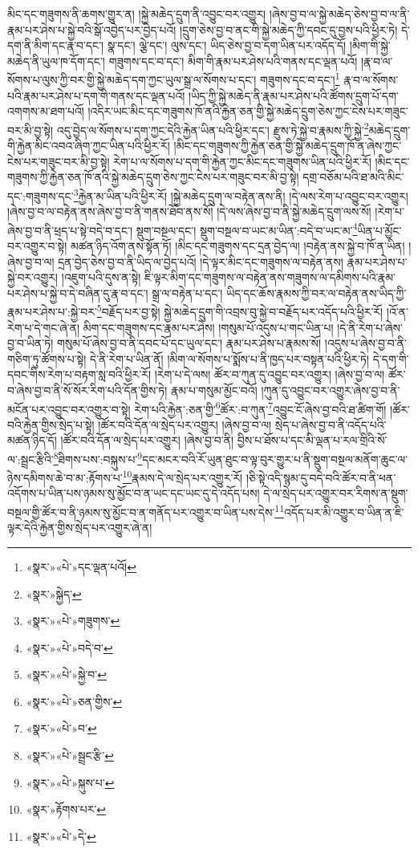 མིང་དང་གཟུགས་ནི་ཆགས་གྱུར་ན། །སྐྱེ་མཆེད་དྲུག་ནི་འབྱུང་བར་འགྱུར། །ཞེས་བྱ་བ་ལ་སྐྱེ་མཆེད་ཅེས་བྱ་བ་ལ་ནི་རྣམ་པར་ཤེས་པ་སྐྱེ་བའི་སྒོ་འབྱེད་པར་བྱེད་པའོ། །དྲུག་ཅེས་བྱ་བ་ནང་གི་སྐྱེ་མཆེད་ཀྱི་དབང་དུ་བྱས་པའི་ཕྱིར་ཏེ། དེ་དག་ནི་མིག་དང་རྣ་བ་དང་། སྣ་དང་། ལྕེ་དང་། ལུས་དང་། ཡིད་ཅེས་བྱ་བ་དག་ཡིན་པར་འདོད་དོ། །མིག་གི་སྐྱེ་མཆེད་ནི་ཡུལ་ཁ་དོག་དང་། གཟུགས་དང་བ་དང་། མིག་གི་རྣམ་པར་ཤེས་པའི་གནས་དང་ལྡན་པའོ། །རྣ་བ་ལ་སོགས་པ་ལུས་ཀྱི་བར་གྱི་སྐྱེ་མཆེད་དག་ཀྱང་ཡུལ་སྒྲ་ལ་སོགས་པ་དང་། གཟུགས་དང་བ་དང་།\footnote{«སྣར་»«པེ་»དང་ལྡན་པའོ།} རྣ་བ་ལ་སོགས་པའི་རྣམ་པར་ཤེས་པ་དག་གི་གནས་དང་ལྡན་པའོ། །ཡིད་ཀྱི་སྐྱེ་མཆེད་ནི་རྣམ་པར་ཤེས་པའི་ཚོགས་དྲུག་པོ་དག་འགགས་མ་ཐག་པའོ། །འདིར་ཡང་མིང་དང་གཟུགས་ཁོ་ནའི་རྐྱེན་ཅན་གྱི་སྐྱེ་མཆེད་དྲུག་ཅེས་ཀྱང་ངེས་པར་གཟུང་བར་མི་བྱ་སྟེ། འདུ་བྱེད་ལ་སོགས་པ་དག་ཀྱང་དེའི་རྐྱེན་ཡིན་པའི་ཕྱིར་དང་། རྫུས་ཏེ་སྐྱེ་བ་རྣམས་ཀྱི་སྐྱེ་\footnote{«སྣར་»སྐྱེད་}མཆེད་དྲུག་གི་རྐྱེན་མིང་འབའ་ཞིག་ཀྱང་ཡིན་པའི་ཕྱིར་རོ། །མིང་དང་གཟུགས་ཀྱི་རྐྱེན་ཅན་གྱི་སྐྱེ་མཆེད་དྲུག་ཁོ་ན་ཞེས་ཀྱང་ངེས་པར་གཟུང་བར་མི་བྱ་སྟེ། རེག་པ་ལ་སོགས་པ་དག་གི་རྐྱེན་ཀྱང་མིང་དང་གཟུགས་ཡིན་པའི་ཕྱིར་རོ། །མིང་དང་གཟུགས་ཀྱི་རྐྱེན་ཅན་ཁོ་ནའི་སྐྱེ་མཆེད་དྲུག་ཅེས་ཀྱང་ངེས་པར་གཟུང་བར་མི་བྱ་སྟེ། དགྲ་བཅོམ་པའི་ཐ་མའི་མིང་དང་:གཟུགས་དང་\footnote{«སྣར་»«པེ་»གཟུགས་}རྐྱེན་མ་ཡིན་པའི་ཕྱིར་རོ། །སྐྱེ་མཆེད་དྲུག་ལ་བརྟེན་ནས་ནི། །དེ་ལས་རེག་པ་འབྱུང་བར་འགྱུར། །ཞེས་བྱ་བ་ལ་བརྟེན་ནས་ཞེས་བྱ་བ་ནི་གནས་ཐོབ་ནས་སོ། །དེ་ལས་ཞེས་བྱ་བ་ནི་སྐྱེ་མཆེད་དྲུག་ལས་སོ། །རེག་པ་ཞེས་བྱ་བ་ནི་ཕྲད་པ་སྟེ་བདེ་བ་དང་། སྡུག་བསྔལ་དང་། སྡུག་བསྔལ་བ་ཡང་མ་ཡིན་:བདེ་བ་ཡང་མ་\footnote{«སྣར་»«པེ་»བདེ་བ་}ཡིན་པ་མྱོང་བར་འགྱུར་བ་སྟེ། མཚན་ཉིད་འོག་ནས་སྟོན་ཏོ། །མིང་དང་གཟུགས་དང་དྲན་བྱེད་ལ། །བརྟེན་ནས་སྐྱེ་བ་ཁོ་ན་ཡིན། །ཞེས་བྱ་བ་ལ། དྲན་བྱེད་ཅེས་བྱ་བ་ནི་ཡིད་ལ་བྱེད་པའོ། །དེ་ལྟར་མིང་དང་གཟུགས་ལ་བརྟེན་ནས། རྣམ་པར་ཤེས་པ་སྐྱེ་བར་འགྱུར། །འཇུག་པའི་དུས་ན་སྟེ། ཇི་ལྟར་མིག་དང་གཟུགས་ལ་བརྟེན་ནས་གཟུགས་ལ་དམིགས་པའི་རྣམ་པར་ཤེས་པ་སྐྱེ་བ་དེ་བཞིན་དུ་རྣ་བ་དང་། སྒྲ་ལ་བརྟེན་པ་དང་། ཡིད་དང་ཆོས་རྣམས་ཀྱི་བར་ལ་བརྟེན་ནས་ཡིད་ཀྱི་རྣམ་པར་ཤེས་པ་:སྐྱེ་བར་\footnote{«སྣར་»«པེ་»སྐྱེ་བ་}བརྗོད་པར་བྱ་སྟེ། སྐྱེ་མཆེད་དྲུག་གི་འབྲས་བུ་སྐྱེ་བ་བརྗོད་པར་འདོད་པའི་ཕྱིར་རོ། །འོ་ན་རེག་པ་དེ་གང་ཞེ་ན། མིག་དང་གཟུགས་དང་རྣམ་པར་ཤེས། །གསུམ་པོ་འདུས་པ་གང་ཡིན་པ། །དེ་ནི་རེག་པ་ཞེས་བྱ་བ་ཡིན་ཏེ། གསུམ་པོ་ཞེས་བྱ་བ་ནི་དབང་པོ་དང་ཡུལ་དང་། རྣམ་པར་ཤེས་པ་རྣམས་སོ། །འདུས་པ་ཞེས་བྱ་བ་ནི་གཅིག་ཏུ་ཚོགས་པ་སྟེ། དེ་ནི་རེག་པ་ཡིན་ནོ། །མིག་ལ་སོགས་པ་སྨོས་པ་ནི་ཁྱད་པར་བསྟན་པའི་ཕྱིར་ཏེ། དེ་དག་གི་དབང་གིས་རེག་པ་བརྟག་སླ་བའི་ཕྱིར་རོ། །རེག་པ་དེ་ལས། ཚོར་བ་ཀུན་དུ་འབྱུང་བར་འགྱུར། །ཞེས་བྱ་བ་ལ། ཚོར་བ་ཞེས་བྱ་བ་ནི་སོ་སོར་རིག་པའི་དོན་གྱིས་ཏེ། རྣམ་པ་གསུམ་མྱོང་བའོ། །ཀུན་དུ་འབྱུང་བར་འགྱུར་ཞེས་བྱ་བ་ནི་མངོན་པར་འབྱུང་བར་འགྱུར་བ་སྟེ། རེག་པའི་རྐྱེན་:ཅན་གྱི་\footnote{«སྣར་»«པེ་»ཅན་གྱིས་}ཚོར་:བ་ཀུན་\footnote{«སྣར་»«པེ་»བ་}འབྱུང་ངོ་ཞེས་བྱ་བའི་ཐ་ཚིག་གོ། །ཚོར་བའི་རྐྱེན་གྱིས་སྲེད་པ་སྟེ། །ཚོར་བའི་དོན་ལ་སྲེད་པར་འགྱུར། །ཞེས་བྱ་བ་ལ། སྲེད་པ་ཞེས་བྱ་བ་ནི་འདོད་པའི་མཚན་ཉིད་དོ། །ཚོར་བའི་དོན་ལ་སྲེད་པར་འགྱུར། །ཞེས་བྱ་བ་ནི། བྱིས་པ་ཐོས་པ་དང་མི་ལྡན་པ་རལ་གྲིའི་སོ་ལ་:སྦྲང་རྩིའི་\footnote{«སྣར་»«པེ་»སྦྲང་རྩི་}ཐིགས་པས་:བསྐུས་པ་\footnote{«སྣར་»«པེ་»སྐུས་པ་}དང་མངར་བའི་རོ་ཡུན་ཐུང་བ་ལྟ་བུར་གྱུར་པ་ནི་སྡུག་བསྔལ་མནོག་ཆུང་ལ་ཉེས་དམིགས་ཆེ་བ་མ་:རྟོགས་པ་\footnote{«སྣར་»རྟོགས་པར་}རྣམས་དེ་ལ་སྲེད་པར་འགྱུར་རོ། །ཅི་སྟེ་འདི་སྙམ་དུ་བདེ་བའི་ཚོར་བ་ནི་ཕན་འདོགས་པ་ཡིན་པས་ཉམས་སུ་མྱོང་བ་ན་ཡང་དང་ཡང་དུ་དེ་འདོད་པས། དེ་ལ་སྲེད་པར་འགྱུར་བར་རིགས་ན་སྡུག་བསྔལ་གྱི་ཚོར་བ་ནི་ཉམས་སུ་མྱོང་བ་ན་གནོད་པར་འགྱུར་བ་ཡིན་པས་དེས་\footnote{«སྣར་»«པེ་»དེ་}འདོད་པར་མི་འགྱུར་བ་ཡིན་ན་ཇི་ལྟར་དེའི་རྐྱེན་གྱིས་སྲེད་པར་འགྱུར་ཞེ་ན། 